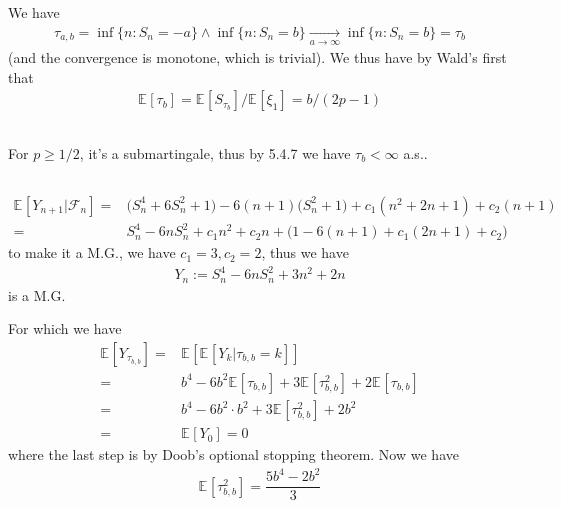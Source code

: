 \documentclass[11pt,a4paper]{ctexart}
\numberwithin{equation}{section}%
\newcommand{\F}{\mathcal{F}}
\begin{document}
We have
\begin{align*}
    \tau_{a,b} = \inf\{n: S_n = -a\} \wedge \inf\{n: S_n = b\} \mathop{ \to }\limits_{a\to\infty} \inf\{n: S_n = b\} = \tau_b
\end{align*}
(and the convergence is monotone, which is trivial). We thus have by Wald's first that
\begin{align*}
    \mathbb{E}_{  }\left[ \tau_b \right] = \mathbb{E}_{  }\left[ S_{\tau_b} \right] / \mathbb{E}_{  }\left[ \xi _1 \right] = b/(2p-1)
\end{align*}

\subsection{}

For $ p \geq 1/2$, it's a submartingale, thus by 5.4.7 we have $ \tau_b<\infty  $ a.s..

\subsection{}


\begin{align*}
    \mathbb{E}_{  }\left[ Y_{n+1}|\F_n \right]  =& \big( S_{n}^4 + 6S_{n}^2 +  1 \big) - 6(n+1)\big( S_n^2 + 1 \big) + c_1(n^2 + 2n + 1) + c_2(n+1)\\
    =& S_{n}^4 -6nS_n^2 + c_1n^2 + c_2n + \big( 1-6(n+1) + c_1(2n+1) + c_2 \big)
\end{align*}
to make it a M.G., we have $ c_1=3, c_2=2 $, thus we have
\begin{align*}
    Y_n:= S_n^4 -6nS_n^2 + 3n^2 + 2n 
\end{align*}
is a M.G. 

For which we have
\begin{align*}
    \mathbb{E}_{  }\left[ Y_{\tau_{b,b}} \right]=& \mathbb{E}_{  }\left[ \mathbb{E}_{  }\left[ Y_{k} | \tau_{b,b}=k \right]  \right] \\
    =& b^4 - 6b^2\mathbb{E}_{  }\left[ \tau_{b,b} \right] + 3\mathbb{E}_{  }\left[ \tau_{b,b}^2 \right] + 2\mathbb{E}_{  }\left[ \tau_{b,b} \right] \\ 
    =& b^4 -6b^2\cdot b^2 + 3\mathbb{E}_{  }\left[ \tau_{b,b}^2 \right] + 2b^2\\
    =&\mathbb{E}_{  }\left[ Y_0 \right] = 0 
\end{align*}
where the last step is by Doob's optional stopping theorem. Now we have
\begin{align*}
    \mathbb{E}_{  }\left[ \tau_{b,b} ^2\right]  = \dfrac{ 5b^4 - 2b^2 }{ 3 }  
\end{align*}
\end{document}
